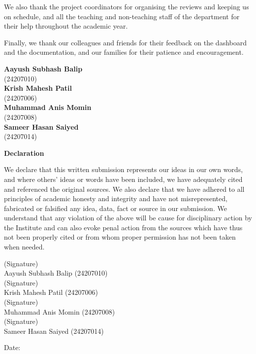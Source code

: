 \documentclass[12pt,a4paper,oneside]{report}
\begin{document}
We also thank the project coordinators for organising the reviews and keeping us on schedule, and all the teaching and non-teaching staff of the department for their help throughout the academic year.

Finally, we thank our colleagues and friends for their feedback on the dashboard and the documentation, and our families for their patience and encouragement.

\vspace{0.45in}
\begin{flushleft}
\textbf{Aayush Subhash Balip}\\(24207010)\\[0.15in]
\textbf{Krish Mahesh Patil}\\(24207006)\\[0.15in]
\textbf{Muhammad Anis Momin}\\(24207008)\\[0.15in]
\textbf{Sameer Hasan Saiyed}\\(24207014)
\end{flushleft}
\clearpage

\thispagestyle{empty}
\vspace*{0.55in}
\begin{center}\large\bfseries Declaration\end{center}
\vspace{0.35in}
We declare that this written submission represents our ideas in our own words, and where others' ideas or words have been included, we have adequately cited and referenced the original sources. We also declare that we have adhered to all principles of academic honesty and integrity and have not misrepresented, fabricated or falsified any idea, data, fact or source in our submission. We understand that any violation of the above will be cause for disciplinary action by the Institute and can also evoke penal action from the sources which have thus not been properly cited or from whom proper permission has not been taken when needed.

\vspace{0.5in}
\begin{flushright}
(Signature)\\ Aayush Subhash Balip (24207010)\\[0.28in]
(Signature)\\ Krish Mahesh Patil (24207006)\\[0.28in]
(Signature)\\ Muhammad Anis Momin (24207008)\\[0.28in]
(Signature)\\ Sameer Hasan Saiyed (24207014)
\end{flushright}
\vfill
Date: 
\clearpage
\end{document}
